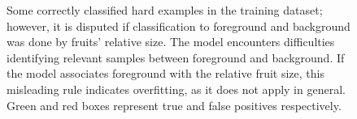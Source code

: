 \begin{figure}[!ht]
  \caption{Some correctly classified hard examples in the training dataset; however, it is disputed if classification to foreground and background was done by fruits' relative size. The model encounters difficulties identifying relevant samples between foreground and background. If the model associates foreground with the relative fruit size, this misleading rule indicates overfitting, as it does not apply in general. Green and red boxes represent true and false positives respectively.}
  \label{ch6:fig3}


\end{figure}
